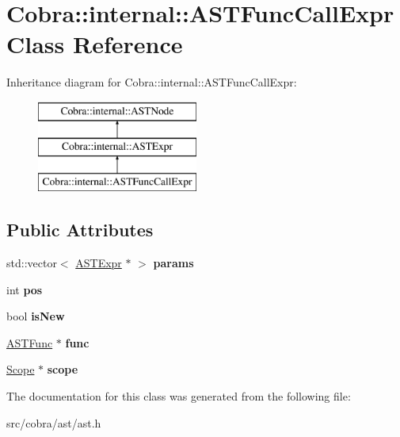 \hypertarget{class_cobra_1_1internal_1_1_a_s_t_func_call_expr}{\section{Cobra\+:\+:internal\+:\+:A\+S\+T\+Func\+Call\+Expr Class Reference}
\label{class_cobra_1_1internal_1_1_a_s_t_func_call_expr}
}
Inheritance diagram for Cobra\+:\+:internal\+:\+:A\+S\+T\+Func\+Call\+Expr\+:\begin{figure}[H]
\begin{center}
\leavevmode
\includegraphics[height=3.000000cm]{class_cobra_1_1internal_1_1_a_s_t_func_call_expr}
\end{center}
\end{figure}
\subsection*{Public Attributes}
\begin{DoxyCompactItemize}
\item 
\hypertarget{class_cobra_1_1internal_1_1_a_s_t_func_call_expr_aa753794f6a51fe645d6168aa4f83c594}{std\+::vector$<$ \hyperlink{class_cobra_1_1internal_1_1_a_s_t_expr}{A\+S\+T\+Expr} $\ast$ $>$ {\bfseries params}}\label{class_cobra_1_1internal_1_1_a_s_t_func_call_expr_aa753794f6a51fe645d6168aa4f83c594}

\item 
\hypertarget{class_cobra_1_1internal_1_1_a_s_t_func_call_expr_ac2d3cd56d13cd40bae1eb030183e2d1f}{int {\bfseries pos}}\label{class_cobra_1_1internal_1_1_a_s_t_func_call_expr_ac2d3cd56d13cd40bae1eb030183e2d1f}

\item 
\hypertarget{class_cobra_1_1internal_1_1_a_s_t_func_call_expr_a5842d495d42a61e1504dec7ca8a8e4a5}{bool {\bfseries is\+New}}\label{class_cobra_1_1internal_1_1_a_s_t_func_call_expr_a5842d495d42a61e1504dec7ca8a8e4a5}

\item 
\hypertarget{class_cobra_1_1internal_1_1_a_s_t_func_call_expr_a2cbcc879dc96092f1a8a627d85524b69}{\hyperlink{class_cobra_1_1internal_1_1_a_s_t_func}{A\+S\+T\+Func} $\ast$ {\bfseries func}}\label{class_cobra_1_1internal_1_1_a_s_t_func_call_expr_a2cbcc879dc96092f1a8a627d85524b69}

\item 
\hypertarget{class_cobra_1_1internal_1_1_a_s_t_func_call_expr_a28afbf7c743500c44ca999c95f1f2346}{\hyperlink{class_cobra_1_1internal_1_1_scope}{Scope} $\ast$ {\bfseries scope}}\label{class_cobra_1_1internal_1_1_a_s_t_func_call_expr_a28afbf7c743500c44ca999c95f1f2346}

\end{DoxyCompactItemize}


The documentation for this class was generated from the following file\+:\begin{DoxyCompactItemize}
\item 
src/cobra/ast/ast.\+h\end{DoxyCompactItemize}
